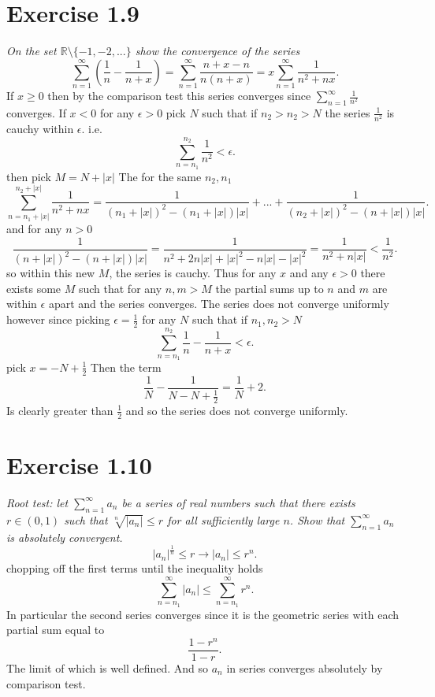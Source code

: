 \documentclass{amsart}
\begin{document}
    \section{Exercise 1.9}
    \emph{
        On the set $ \mathbb{R} \setminus \{-1,-2,...\}$ show the convergence of the series
        \[
        \sum_{n=1}^{\infty}(\frac{1}{n}-\frac{1}{n+x}) = \sum_{n=1}^{\infty}\frac{n+x-n}{n(n+x)} = x\sum_{n=1}^{\infty}\frac{1}{n^2+nx}
        .\] 
    }
        If $x \ge 0$ then by the comparison test this series converges since $\sum_{n=1}^{\infty}\frac{1}{n^2}$ converges.
        If $x < 0$  for any $\epsilon > 0$ pick $N$ such that if $n_2 > n_2 > N$ the series $\frac{1}{n^2}$ is cauchy within $\epsilon$. i.e.
        \[
        \sum_{n=n_1}^{n_2}\frac{1}{n^2} < \epsilon
        .\] 
        then pick $M = N + |x|$
        The for the same  $n_2,n_1$
        \[
        \sum_{n=n_1+|x|}^{n_2+|x|}\frac{1}{n^2+nx} = \frac{1}{(n_1+|x|)^2-(n_1+|x|)|x|} + ... + \frac{1}{(n_2+|x|)^2-(n+|x|)|x|}
        .\] 
        and for any $n > 0$ 
        \[
        \frac{1}{(n+|x|)^2-(n+|x|)|x|} = \frac{1}{n^2+2n|x|+|x|^2-n|x|-|x|^2} = \frac{1}{n^2+n|x|} < \frac{1}{n^2}
        .\] 
        so within this new $M$, the series is cauchy. Thus for any $x$ and any $\epsilon > 0$ there exists some $M$ such that for any
        $n,m > M$ the partial sums up to $n$ and $m$ are within $\epsilon$ apart and the series converges. The series does not converge uniformly however
        since picking  $\epsilon = \frac{1}{2}$ for any $N$ such that if $n_1,n_2 > N$
        \[
        \sum_{n=n_1}^{n_2}\frac{1}{n} - \frac{1}{n+x} < \epsilon
        .\] 
        pick $x = -N+\frac{1}{2}$ Then the term
        \[
        \frac{1}{N} - \frac{1}{N-N + \frac{1}{2}} = \frac{1}{N} + 2
        .\] 
        Is clearly greater than $\frac{1}{2}$ and so the series does not converge uniformly.

        \section{Exercise 1.10}
        \emph{Root test: let $\sum_{n=1}^{\infty}a_n$ be a series of real numbers such that there exists
            $r \in (0,1)$ such that $\sqrt[n]{|a_n|} \le r$ for all sufficiently large $n$. Show that $\sum_{n=1}^{\infty}a_n$ is
            absolutely convergent.
        } \\
        \[
        |a_n|^{\frac{1}{n}} \le r \rightarrow |a_n| \le r^{n}
        .\] 
        chopping off the first terms until the inequality holds
        \[
        \sum_{n=n_1}^{\infty}|a_n| \le \sum_{n=n_1}^{\infty}r^{n}
        .\] 
        In particular the second series converges since it is the geometric series with each partial sum equal to
        \[
            \frac{1-r^{n}}{1-r} 
        .\] 
        The limit of which is well defined. And so $a_n$ in series converges absolutely by comparison test.
\end{document}
